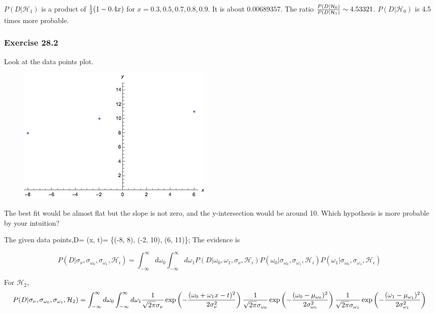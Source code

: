 \documentclass[a4paper,11pt]{article}
\numberwithin{equation}{section}
\begin{document}
{$P(D|\mathcal{H}_1)$ is a product of ${1 \over 2} (1- 0.4 x)$ for $x= 0.3,0.5,0.7,0.8,0.9$. It is about $0.00689357$. The ratio ${P(D|\mathcal{H}_0) \over P(D|\mathcal{H}_1)} \sim 4.53321$. $P(D|\mathcal{H}_0)$ is 4.5 times more probable. 

\subsubsection{Exercise 28.2}

Look at the data points plot. 

\begin{figure}[h!]
\centerline{
\includegraphics[width=.7\textwidth]{datapointsExercise28-2.png}}
 \caption[The plot of exercise 28.2-1]{\label{Exercise28-2-1} \small }
\end{figure}

The best fit would be almost flat but the slope is not zero, and the y-intersection would be around 10. Which hypothesis is more probable by your intuition? 


The given data points,D= (x, t)= \{(-8, 8), (-2, 10), (6, 11)\};
The evidence is  

{\small 
$$
P(D|\sigma_{\nu}, \sigma_{\omega_0},\sigma_{\omega_1},\mathcal{H}_i) = \int^{\infty}_{-\infty} d\omega_0 \int^{\infty}_{-\infty} d\omega_1 P(D|\omega_0, \omega_1,\sigma_{\nu}, \mathcal{H}_i) P(\omega_0| \sigma_{\omega_0},\sigma_{\omega_1},\mathcal{H}_i)P(\omega_1| \sigma_{\omega_0},\sigma_{\omega_1},\mathcal{H}_i)
$$ }

For $\mathcal{H}_2$,
{\tiny
$$
P(D|\sigma_{\nu}, \sigma_{\omega_0},\sigma_{\omega_1},\mathcal{H}_2) = \int^{\infty}_{-\infty} d\omega_0 \int^{\infty}_{-\infty} d\omega_1 
{1\over \sqrt{2\pi }\sigma_{\nu}} 
\exp\left(-{(\omega_0+\omega_1 x - t)^2\over 2\sigma^2_{\nu}}\right){1\over \sqrt{2\pi }\sigma_{\omega_0}} 
\exp\left(-{(\omega_0-\mu_{\omega_0})^2\over 2\sigma^2_{{\omega_0}}}\right){1\over \sqrt{2\pi }\sigma_{\omega_1}} 
\exp\left(-{(\omega_1-\mu_{\omega_1})^2\over 2\sigma^2_{{\omega_1}}}\right)
$$ }

}
\end{document}
